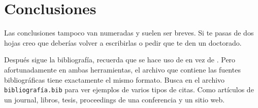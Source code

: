 \chapter*{Conclusiones}

Las conclusiones tampoco van numeradas y suelen ser breves.
Si te pasas de dos hojas creo que deberías volver a escribirlas o pedir que te den un doctorado.

Después sigue la bibliografía, recuerda que se hace uso de  en vez de .
Pero afortunadamente en ambas herramientas, el archivo que contiene las fuentes bibliográficas tiene exactamente el mismo formato.
Busca en el archivo \verb|bibliografía.bib| para ver ejemplos de varios tipos de citas.
Como artículos de un journal, libros, tesis, proceedings de una conferencia y un sitio web.

